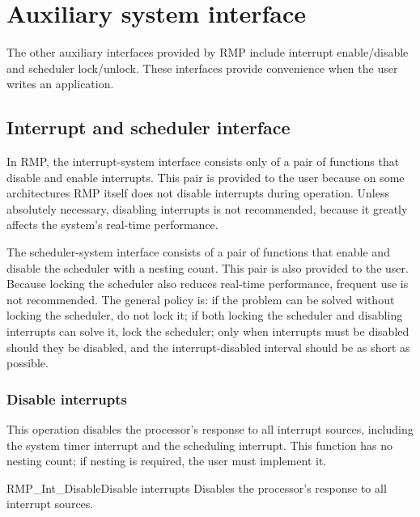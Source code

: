 \section{Auxiliary system interface}

The other auxiliary interfaces provided by RMP include interrupt enable/disable and scheduler lock/unlock.
These interfaces provide convenience when the user writes an application.

\subsection{Interrupt and scheduler interface}

In RMP, the interrupt-system interface consists only of a pair of functions that disable and enable interrupts.
This pair is provided to the user because on some architectures RMP itself does not disable interrupts during operation.
Unless absolutely necessary, disabling interrupts is not recommended, because it greatly affects the system's real-time performance.

The scheduler-system interface consists of a pair of functions that enable and disable the scheduler with a nesting count.
This pair is also provided to the user.
Because locking the scheduler also reduces real-time performance, frequent use is not recommended.
The general policy is: if the problem can be solved without locking the scheduler, do not lock it; if both locking the scheduler and disabling interrupts can solve it, lock the scheduler; only when interrupts must be disabled should they be disabled, and the interrupt-disabled interval should be as short as possible.

\subsubsection{Disable interrupts}

This operation disables the processor's response to all interrupt sources, including the system timer interrupt and the scheduling interrupt.
This function has no nesting count; if nesting is required, the user must implement it.

\begin{apidesc}{RMP\_Int\_Disable}{Disable interrupts}\label{api:RMP_Int_Disable_Ch2}
    Disables the processor's response to all interrupt sources.
    \begin{apiparams}
    \end{apiparams}
    \begin{apiret}
    \end{apiret}
\end{apidesc}

